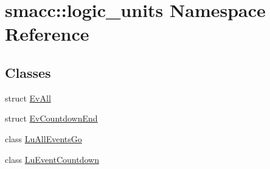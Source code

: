 \hypertarget{namespacesmacc_1_1logic__units}{}\section{smacc\+:\+:logic\+\_\+units Namespace Reference}
\label{namespacesmacc_1_1logic__units}
\subsection*{Classes}
\begin{DoxyCompactItemize}
\item 
struct \hyperlink{structsmacc_1_1logic__units_1_1EvAll}{Ev\+All}
\item 
struct \hyperlink{structsmacc_1_1logic__units_1_1EvCountdownEnd}{Ev\+Countdown\+End}
\item 
class \hyperlink{classsmacc_1_1logic__units_1_1LuAllEventsGo}{Lu\+All\+Events\+Go}
\item 
class \hyperlink{classsmacc_1_1logic__units_1_1LuEventCountdown}{Lu\+Event\+Countdown}
\end{DoxyCompactItemize}
